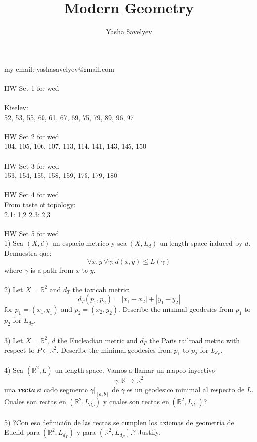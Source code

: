 \documentclass{amsart}
\title{Modern Geometry}
\author{Yasha Savelyev}
\begin{document}
\maketitle
\section{}
my email: yashasavelyev@gmail.com
\\\\
HW Set 1 for wed
\\\\
Kiselev: 
\\
52, 53, 55, 60, 61, 67, 69, 75, 79, 89, 96, 97
\\\\
HW Set 2 for wed
\\
104, 105, 106, 107, 113, 114, 141, 143, 145, 150
\\\\
HW Set 3 for wed
\\
153, 154, 155, 158, 159, 178, 179, 180
\\\\
HW Set 4 for wed
\\
From taste of topology:
\\
2.1: 1,2 
2.3: 2,3 
\\\\
HW Set 5 for wed
\\
1) Sea $(X, d) $ un espacio metrico y sea $(X, L _{d})$ un length space induced by $d$. Demuestra que: $$\forall x,y \, \forall \gamma: d (x,y) \leq L (\gamma)$$ where $\gamma$  is a path from $x$ to $y$. 
\\\\
2) Let $X = \mathbb{R} ^{2}$ and $d _{T}$ the taxicab metric:
$$d _{T} (p _{1}, p _{2}) = |x _{1} - x _{2}| + |y _{1} - y _{2}|$$ for $p _{1} = (x _{1}, y _{1}) $ and $p _{2} = (x _{2}, y _{2})$.
Describe the minimal geodesics from $p _{1}$ to $p _{2}$ for $L _{d _{T}}$. 
\\\\
3) Let $X = \mathbb{R} ^{2}$, $d$  the Eucleadian metric and $d _{P}$ the Paris railroad metric with respect to $P \in \mathbb{R} ^{2}$. Describe the minimal geodesics from $p _{1}$  to $p _{2}$ for $L _{d _{P}}$. 
\\\\
4) Sea $(\mathbb{R} ^{2}, L) $ un length space. Vamos a llamar un mapeo inyectivo $$\gamma: \mathbb{R} ^{} \to \mathbb{R} ^{2} $$ una \textbf{\emph{recta}} si cado segmento $\gamma | _{[a,b]}$ de $\gamma$ es un geodesico minimal al respecto de $L$. Cuales son rectas en $(\mathbb{R} ^{2}, L _{d _{P}}) $
y cuales son rectas en $(\mathbb{R} ^{2}, L _{d _{T}}) $?
\\\\
5) ?Con eso definición de las rectas se cumplen los axiomas de geometría de Euclid para $(\mathbb{R} ^{2}, L _{d _{T}}) $ y para $(\mathbb{R} ^{2}, L _{d _{P}}) $.? Justify.
\\\\
\end{document}
